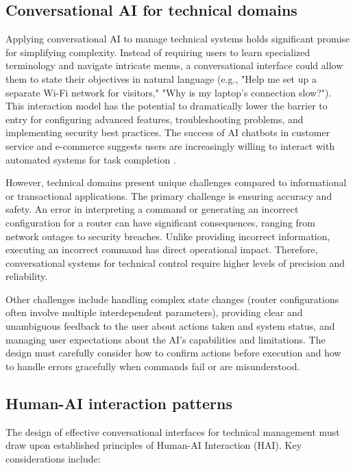 \subsection{Conversational AI for technical domains}
Applying conversational AI to manage technical systems holds significant promise for simplifying complexity. Instead of requiring users to learn specialized terminology and navigate intricate menus, a conversational interface could allow them to state their objectives in natural language (e.g., "Help me set up a separate Wi-Fi network for visitors," "Why is my laptop's connection slow?"). This interaction model has the potential to dramatically lower the barrier to entry for configuring advanced features, troubleshooting problems, and implementing security best practices. The success of AI chatbots in customer service and e-commerce suggests users are increasingly willing to interact with automated systems for task completion \cite{parental_controls_value}.

However, technical domains present unique challenges compared to informational or transactional applications. The primary challenge is ensuring accuracy and safety. An error in interpreting a command or generating an incorrect configuration for a router can have significant consequences, ranging from network outages to security breaches. Unlike providing incorrect information, executing an incorrect command has direct operational impact. Therefore, conversational systems for technical control require higher levels of precision and reliability.

Other challenges include handling complex state changes (router configurations often involve multiple interdependent parameters), providing clear and unambiguous feedback to the user about actions taken and system status, and managing user expectations about the AI's capabilities and limitations. The design must carefully consider how to confirm actions before execution and how to handle errors gracefully when commands fail or are misunderstood.

\subsection{Human-AI interaction patterns}
The design of effective conversational interfaces for technical management must draw upon established principles of Human-AI Interaction (HAI). Key considerations include:

